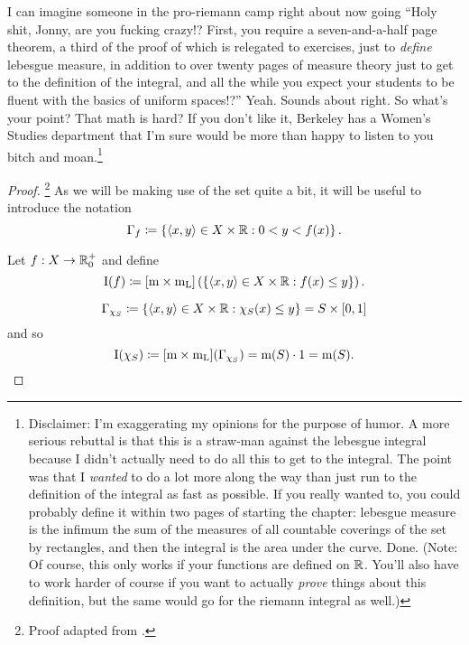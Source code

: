 \begin{thm}[Integral]
\begin{savenotes}
\begin{rmk}
I can imagine someone in the pro-riemann camp right about now going ``Holy shit, Jonny, are you fucking crazy!?  First, you require a seven-and-a-half page theorem, a third of the proof of which is relegated to exercises, just to \emph{define} lebesgue measure,  in addition to over twenty pages of measure theory just to get to the definition of the integral, and all the while you expect your students to be fluent with the basics of uniform spaces!?''  Yeah.  Sounds about right.  So what's your point?  That math is hard?  If you don't like it, Berkeley has a Women's Studies department that I'm sure would be more than happy to listen to you bitch and moan.\footnote{Disclaimer:  I'm exaggerating my opinions for the purpose of humor.  A more serious rebuttal is that this is a straw-man against the lebesgue integral because I didn't actually need to do all this to get to the integral.  The point was that I \emph{wanted} to do a lot more along the way than just run to the definition of the integral as fast as possible.  If you really wanted to, you could probably define it within two pages of starting the chapter:  lebesgue measure is the infimum the sum of the measures of all countable coverings of the set by rectangles, and then the integral is the area under the curve.  Done.  (Note:  Of course, this only works if your functions are defined on $\mathbb{R}$.  You'll also have to work harder of course if you want to actually \emph{prove} things about this definition, but the same would go for the riemann integral as well.)}
\end{rmk}
\begin{proof}\footnote{Proof adapted from \cite[pg.~377]{Pugh}.}
As we will be making use of the set quite a bit, it will be useful to introduce the notation
\begin{equation}
\Gamma _f\coloneqq \left\{ \langle x,y\rangle\in X\times \mathbb{R} :0<y<f(x)\right\} .
\end{equation}

Let $f:X\rightarrow \mathbb{R} _0^+$ and define
\begin{equation}
\mathrm{I}(f)\coloneqq [\mathrm{m} \times \mathrm{m} _{\mathrm{L}}]\left( \left\{ \langle x,y\rangle\in X\times \mathbb{R} :f(x)\leq y\right\} \right) .
\end{equation}

\begin{equation}
\Gamma _{\chi _S}\coloneqq \left\{ \langle x,y\rangle\in X\times \mathbb{R} :\chi _S(x)\leq y\right\} =S\times [0,1]
\end{equation}
and so
\begin{equation}
\mathrm{I}(\chi _S)\coloneqq [\mathrm{m} \times \mathrm{m} _{\mathrm{L}}](\Gamma _{\chi _S})=\mathrm{m} (S)\cdot 1=\mathrm{m} (S).
\end{equation}


\end{proof}
\end{savenotes}
\end{thm}
